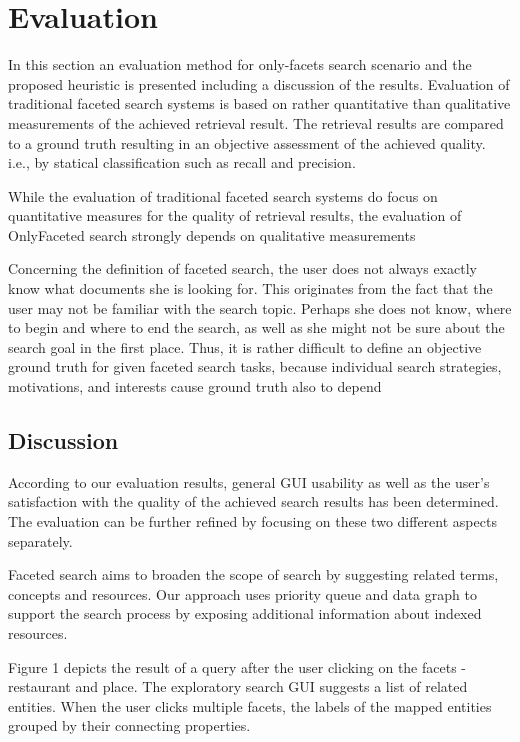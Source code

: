 \chapter{Evaluation}

In this section an evaluation method for only-facets search scenario and the proposed heuristic is presented including a discussion of the results. Evaluation of traditional faceted search systems is based on rather quantitative than qualitative measurements of the achieved retrieval result. The retrieval results are compared to a ground truth resulting in an objective assessment of the achieved quality. i.e., by statical classification such as recall and precision.

While the evaluation of traditional faceted search systems do focus on quantitative measures for the quality of retrieval results, the evaluation of OnlyFaceted search strongly depends on qualitative measurements

Concerning the definition of faceted search, the user does not always exactly know what documents she is looking for. This originates from the fact that the user may not be familiar with the search topic. Perhaps she does not know, where to begin and where to end the search, as well as she might not be sure about the search goal in the first place. Thus, it is rather difficult to define an objective ground truth for given faceted search tasks, because individual search strategies, motivations, and interests cause ground truth also to depend 

\section{Discussion}

According to our evaluation results, general GUI usability as well as the user's satisfaction with the quality of the achieved search results has been determined. The evaluation can be further refined by focusing on these two different aspects separately. 



Faceted search aims to broaden the scope of search by suggesting related terms, concepts and resources. Our approach uses priority queue and data graph to support the search process by exposing additional information about indexed resources.

Figure 1 depicts the result of a query after the user clicking on the facets - restaurant and place. The exploratory search GUI suggests a list of related entities. When the user clicks multiple facets, the labels of the mapped entities grouped by their connecting properties. 


